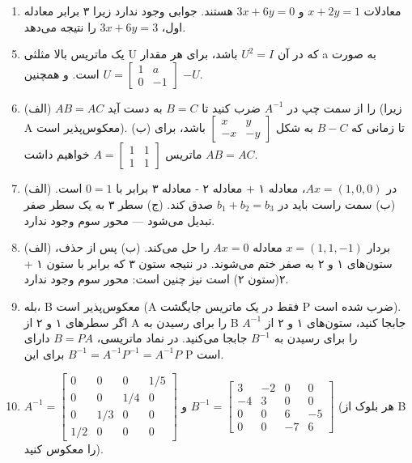 \documentclass[12pt,a4paper]{article}
\begin{document}
{\begin{enumerate}
			\item معادلات $x+2y=1$ و $3x+6y=0$ هستند. جوابی وجود ندارد زیرا ۳ برابر معادله اول، $3x+6y=3$ را نتیجه می‌دهد.
		\end{enumerate}
		
		
		\begin{enumerate}
			\setcounter{enumi}{4}
			\item یک ماتریس بالا مثلثی U که در آن $U^2=I$ باشد، برای هر مقدار a به صورت $U=\begin{bmatrix} 1 & a \\ 0 & -1 \end{bmatrix}$ است. و همچنین $-U$.
			
			\item (الف) $AB=AC$ را از سمت چپ در $A^{-1}$ ضرب کنید تا $B=C$ به دست آید (زیرا A معکوس‌پذیر است). (ب) تا زمانی که $B-C$ به شکل $\begin{bmatrix} x & y \\ -x & -y \end{bmatrix}$ باشد، برای ماتریس $A=\begin{bmatrix} 1 & 1 \\ 1 & 1 \end{bmatrix}$ خواهیم داشت $AB=AC$.
			
			\item (الف) در $Ax=(1,0,0)$، معادله ۱ + معادله ۲ - معادله ۳ برابر با $0=1$ است. (ب) سمت راست باید در $b_1+b_2=b_3$ صدق کند. (ج) سطر ۳ به یک سطر صفر تبدیل می‌شود — محور سوم وجود ندارد.
			
			\item (الف) بردار $x=(1,1,-1)$ معادله $Ax=0$ را حل می‌کند. (ب) پس از حذف، ستون‌های ۱ و ۲ به صفر ختم می‌شوند. در نتیجه ستون ۳ که برابر با ستون ۱ + ۲(ستون ۲) است نیز چنین است: محور سوم وجود ندارد.
			
			\item بله، B معکوس‌پذیر است (A فقط در یک ماتریس جایگشت P ضرب شده است). اگر سطرهای ۱ و ۲ از A را برای رسیدن به B جابجا کنید، ستون‌های ۱ و ۲ از $A^{-1}$ را برای رسیدن به $B^{-1}$ جابجا می‌کنید. در نماد ماتریسی، $B=PA$ دارای $B^{-1}=A^{-1}P^{-1}=A^{-1}P$ برای این P است.
			
			\item $A^{-1} = \begin{bmatrix} 0 & 0 & 0 & 1/5 \\ 0 & 0 & 1/4 & 0 \\ 0 & 1/3 & 0 & 0 \\ 1/2 & 0 & 0 & 0 \end{bmatrix}$ و $B^{-1} = \begin{bmatrix} 3 & -2 & 0 & 0 \\ -4 & 3 & 0 & 0 \\ 0 & 0 & 6 & -5 \\ 0 & 0 & -7 & 6 \end{bmatrix}$ (هر بلوک از B را معکوس کنید).
			

\end{enumerate}}
\end{document}
